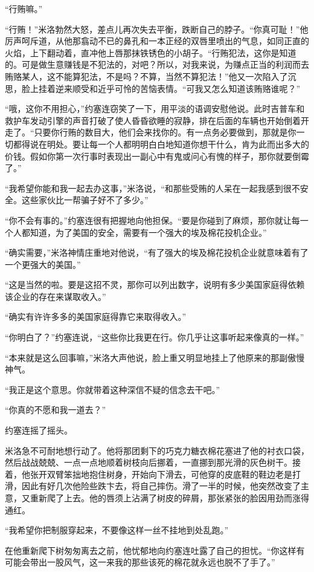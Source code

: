     “行贿嘛。”

    “行贿！”米洛勃然大怒，差点儿再次失去平衡，跌断自己的脖子。“你真可耻！”他厉声呵斥道，从他那翕动不已的鼻孔和一本正经的双唇里喷出的气息，如同正直的火焰，上下翻动着，直冲他上唇那抹铁锈色的小胡子。“行贿犯法，这你是知道的。可是做生意赚钱是不犯法的，对吧？所以，对我来说，为赚点正当的利润而去贿赂某人，这不能算犯法，不是吗？不算，当然不算犯法！”他又一次陷入了沉思，脸上挂着逆来顺受和近乎可怜的苦恼表情。“可我又怎么知道该贿赂谁呢？”

    “哦，这你不用担心，”约塞连窃笑了一下，用平淡的语调安慰他说。此时吉普车和救护车发动引擎的声音打破了使人昏昏欲睡的寂静，排在后面的车辆也开始倒着开走了。“只要你行贿的数目大，他们会来找你的。有一点务必要做到，那就是你一切都得说在明处。要让每一个人都明明白白地知道你想干什么，肯为此而出多大的价钱。假如你第一次行事时表现出一副心中有鬼或问心有愧的样子，那你就要倒霉了。”

    “我希望你能和我一起去办这事，”米洛说，“和那些受贿的人呆在一起我感到很不安全。这些家伙比一帮骗子好不了多少。”

    “你不会有事的。”约塞连很有把握地向他担保。“要是你碰到了麻烦，那你就让每一个人都知道，为了美国的安全，需要有一个强大的埃及棉花投机企业。”

    “确实需要，”米洛神情庄重地对他说，“有了强大的埃及棉花投机企业就意味着有了一个更强大的美国。”

    “这是当然的啦。要是这招不灵，那你可以列出数字，说明有多少美国家庭得依赖该企业的存在来谋取收入。”

    “确实有许许多多的美国家庭得靠它来取得收入。”

    “你明白了？”约塞连说，“这些你比我更在行。你几乎让这事听起来像真的一样。”

    “本来就是这么回事嘛，”米洛大声他说，脸上重又明显地挂上了他原来的那副傲慢神气。

    “我正是这个意思。你就带着这种深信不疑的信念去干吧。”

    “你真的不愿和我一道去？”

    约塞连摇了摇头。

    米洛急不可耐地想行动了。他将那团剩下的巧克力糖衣棉花塞进了他的衬衣口袋，然后战战兢兢、一点一点地顺着树枝向后挪着，一直挪到那光滑的灰色树干。接着，他张开双臂笨拙地抱住树身，开始向下滑去，可他穿的皮底鞋的鞋边老是打滑，因此有好几次他险些跌卞去，将自己摔伤。滑了一半的时候，他突然改变了主意，又重新爬了上去。他的唇须上沾满了树皮的碎屑，那张紧张的脸因用劲而涨得通红。

    “我希望你把制服穿起来，不要像这样一丝不挂地到处乱跑。”

    在他重新爬下树匆匆离去之前，他忧郁地向约塞连吐露了自己的担忧。“你这样有可能会带出一股风气，这一来我的那些该死的棉花就永远也脱不了手了。”
